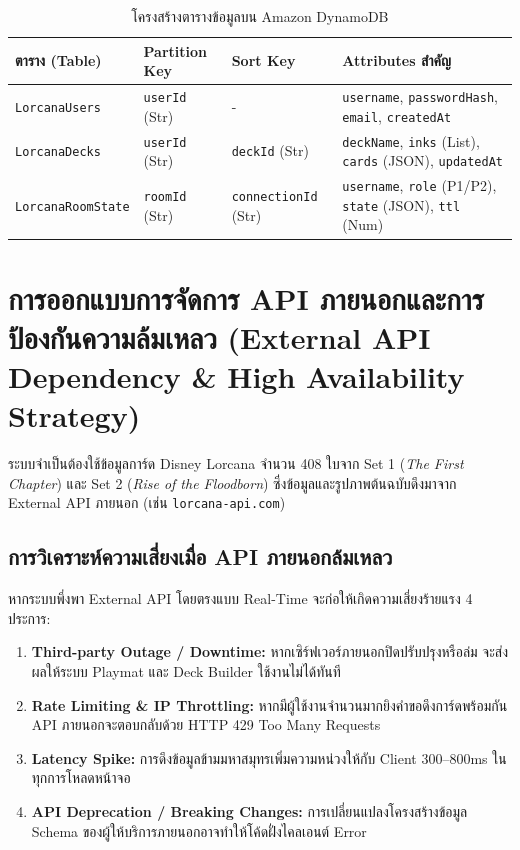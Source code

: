 \documentclass[12pt,a4paper]{report}
\begin{document}
\begin{table}[H]
\centering
\caption{โครงสร้างตารางข้อมูลบน Amazon DynamoDB}
\label{tab:dynamo_schema}
\small
\begin{tabularx}{\textwidth}{p{3.4cm}p{2.1cm}p{2.5cm}X}
\toprule
\textbf{ตาราง (Table)} & \textbf{Partition Key} & \textbf{Sort Key} & \textbf{Attributes สำคัญ} \\
\midrule
\texttt{LorcanaUsers} & \texttt{userId} (Str) & - & \texttt{username}, \texttt{passwordHash}, \texttt{email}, \texttt{createdAt} \\
\texttt{LorcanaDecks} & \texttt{userId} (Str) & \texttt{deckId} (Str) & \texttt{deckName}, \texttt{inks} (List), \texttt{cards} (JSON), \texttt{updatedAt} \\
\texttt{LorcanaRoomState} & \texttt{roomId} (Str) & \texttt{connectionId} (Str) & \texttt{username}, \texttt{role} (P1/P2), \texttt{state} (JSON), \texttt{ttl} (Num) \\
\bottomrule
\end{tabularx}
\end{table}

\section{การออกแบบการจัดการ API ภายนอกและการป้องกันความล้มเหลว (External API Dependency \& High Availability Strategy)}
ระบบจำเป็นต้องใช้ข้อมูลการ์ด Disney Lorcana จำนวน 408 ใบจาก Set 1 (\textit{The First Chapter}) และ Set 2 (\textit{Rise of the Floodborn}) ซึ่งข้อมูลและรูปภาพต้นฉบับดึงมาจาก External API ภายนอก (เช่น \texttt{lorcana-api.com})

\subsection{การวิเคราะห์ความเสี่ยงเมื่อ API ภายนอกล้มเหลว}
หากระบบพึ่งพา External API โดยตรงแบบ Real-Time จะก่อให้เกิดความเสี่ยงร้ายแรง 4 ประการ:
\begin{enumerate}
    \item \textbf{Third-party Outage / Downtime:} หากเซิร์ฟเวอร์ภายนอกปิดปรับปรุงหรือล่ม จะส่งผลให้ระบบ Playmat และ Deck Builder ใช้งานไม่ได้ทันที
    \item \textbf{Rate Limiting \& IP Throttling:} หากมีผู้ใช้งานจำนวนมากยิงคำขอดึงการ์ดพร้อมกัน API ภายนอกจะตอบกลับด้วย HTTP 429 Too Many Requests
    \item \textbf{Latency Spike:} การดึงข้อมูลข้ามมหาสมุทรเพิ่มความหน่วงให้กับ Client 300--800ms ในทุกการโหลดหน้าจอ
    \item \textbf{API Deprecation / Breaking Changes:} การเปลี่ยนแปลงโครงสร้างข้อมูล Schema ของผู้ให้บริการภายนอกอาจทำให้โค้ดฝั่งไคลเอนต์ Error
\end{enumerate}
\end{document}
